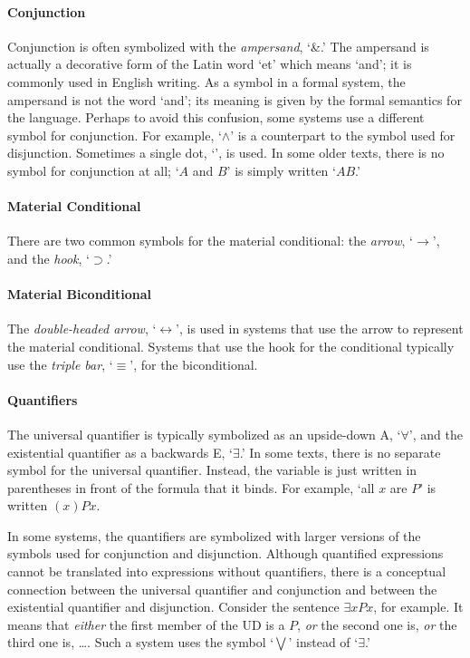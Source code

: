 \paragraph{Conjunction}
Conjunction is often symbolized with the \emph{ampersand}, `{\&}.' The ampersand is actually a decorative form of the Latin word `et' which means `and'; it is commonly used in English writing. As a symbol in a formal system, the ampersand is not the word `and'; its meaning is given by the formal semantics for the language. Perhaps to avoid this confusion, some systems use a different symbol for conjunction. For example, `$\wedge$' is a counterpart to the symbol used for disjunction. Sometimes a single dot, `{\scriptsize\textbullet}', is used. In some older texts, there is no symbol for conjunction at all; `$A$ and $B$' is simply written `$AB$.'

\paragraph{Material Conditional} There are two common symbols for the material conditional: the \emph{arrow}, `$\rightarrow$', and the \emph{hook}, `$\supset$.'

\paragraph{Material Biconditional} The \emph{double-headed arrow}, `$\leftrightarrow$', is used in systems that use the arrow to represent the material conditional. Systems that use the hook for the conditional typically use the \emph{triple bar}, `$\equiv$', for the biconditional.

\paragraph{Quantifiers} The universal quantifier is typically symbolized as an upside-down A, `$\forall$', and the existential quantifier as a backwards E, `$\exists$.' In some texts, there is no separate symbol for the universal quantifier. Instead, the variable is just written in parentheses in front of the formula that it binds. For example, `all $x$ are $P$' is written $(x)Px$.

In some systems, the quantifiers are symbolized with larger versions of the symbols used for conjunction and disjunction. Although quantified expressions cannot be translated into expressions without quantifiers, there is a conceptual connection between the universal quantifier and conjunction and between the existential quantifier and disjunction. Consider the sentence $\exists x Px$, for example. It means that \emph{either} the first member of the UD is a $P$, \emph{or} the second one is, \emph{or} the third one is, {\ldots}. Such a system uses the symbol `$\bigvee$' instead of `$\exists$.'




